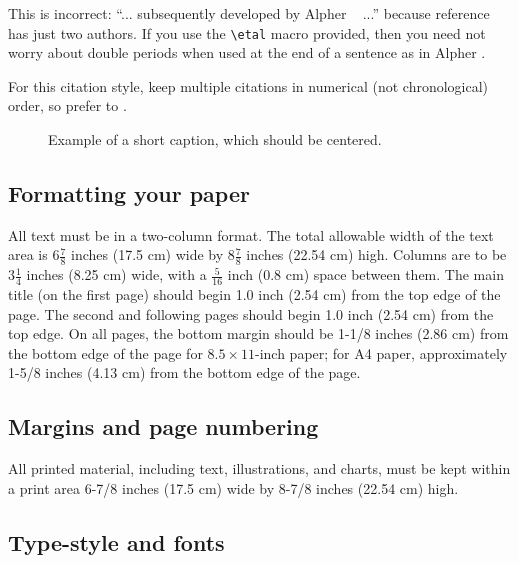\documentclass[10pt,twocolumn,letterpaper]{article}
\begin{document}
This is incorrect: ``... subsequently developed by Alpher \etal~\cite{Alpher03} ...''
because reference~\cite{Alpher03} has just two authors.  If you use the
\verb'\etal' macro provided, then you need not worry about double periods
when used at the end of a sentence as in Alpher \etal.

For this citation style, keep multiple citations in numerical (not
chronological) order, so prefer \cite{Alpher03,Alpher02,Authors14} to
\cite{Alpher02,Alpher03,Authors14}.


\begin{figure}
\begin{center}
\fbox{\rule{0pt}{2in} \rule{.9\linewidth}{0pt}}
\end{center}
   \caption{Example of a short caption, which should be centered.}
\label{fig:short}
\end{figure}

\subsection{Formatting your paper}

All text must be in a two-column format. The total allowable width of the
text area is $6\frac78$ inches (17.5 cm) wide by $8\frac78$ inches (22.54
cm) high. Columns are to be $3\frac14$ inches (8.25 cm) wide, with a
$\frac{5}{16}$ inch (0.8 cm) space between them. The main title (on the
first page) should begin 1.0 inch (2.54 cm) from the top edge of the
page. The second and following pages should begin 1.0 inch (2.54 cm) from
the top edge. On all pages, the bottom margin should be 1-1/8 inches (2.86
cm) from the bottom edge of the page for $8.5 \times 11$-inch paper; for A4
paper, approximately 1-5/8 inches (4.13 cm) from the bottom edge of the
page.

\subsection{Margins and page numbering}

All printed material, including text, illustrations, and charts, must be kept
within a print area 6-7/8 inches (17.5 cm) wide by 8-7/8 inches (22.54 cm)
high.



\subsection{Type-style and fonts}
\end{document}
